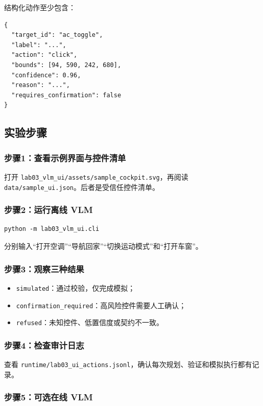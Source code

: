 \documentclass[UTF8,zihao=-4]{ctexart}
\begin{document}
结构化动作至少包含：

\begin{lstlisting}
{
  "target_id": "ac_toggle",
  "label": "...",
  "action": "click",
  "bounds": [94, 590, 242, 680],
  "confidence": 0.96,
  "reason": "...",
  "requires_confirmation": false
}
\end{lstlisting}

\subsection{实验步骤}

\subsubsection{步骤1：查看示例界面与控件清单}

打开 \texttt{lab03\_vlm\_ui/assets/sample\_cockpit.svg}，再阅读 \texttt{data/sample\_ui.json}。后者是受信任控件清单。

\subsubsection{步骤2：运行离线 VLM}

\begin{lstlisting}
python -m lab03_vlm_ui.cli
\end{lstlisting}

分别输入“打开空调”“导航回家”“切换运动模式”和“打开车窗”。

\subsubsection{步骤3：观察三种结果}

\begin{itemize}
  \item \texttt{simulated}：通过校验，仅完成模拟；
  \item \texttt{confirmation\_required}：高风险控件需要人工确认；
  \item \texttt{refused}：未知控件、低置信度或契约不一致。
\end{itemize}

\subsubsection{步骤4：检查审计日志}

查看 \texttt{runtime/lab03\_ui\_actions.jsonl}，确认每次规划、验证和模拟执行都有记录。

\subsubsection{步骤5：可选在线 VLM}
\end{document}
